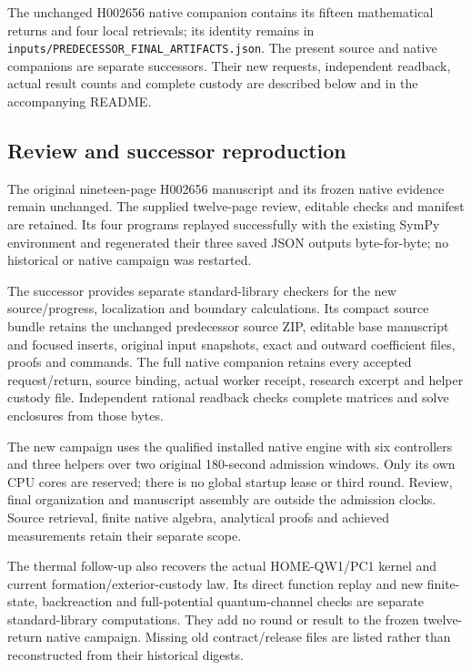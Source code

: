 \documentclass[10pt,twocolumn,letterpaper]{article}
\begin{document}
The unchanged H002656 native companion contains its fifteen mathematical
returns and four local retrievals; its identity remains in
\texttt{inputs/PREDECESSOR\_FINAL\_ARTIFACTS.json}. The present source
and native companions are separate successors. Their new requests,
independent readback, actual result counts and complete custody are
described below and in the accompanying README.


\subsection{Review and successor reproduction}
The original nineteen-page H002656 manuscript and its frozen native
evidence remain unchanged. The supplied twelve-page review, editable
checks and manifest are retained. Its four programs replayed successfully
with the existing SymPy environment and regenerated their three saved
JSON outputs byte-for-byte; no historical or native campaign was restarted.

The successor provides separate standard-library checkers for the new
source/progress, localization and boundary calculations. Its compact
source bundle retains the unchanged predecessor source ZIP, editable
base manuscript and focused inserts, original input snapshots, exact and
outward coefficient files, proofs and commands. The full native companion
retains every accepted request/return, source binding, actual worker
receipt, research excerpt and helper custody file. Independent rational
readback checks complete matrices and solve enclosures from those bytes.

The new campaign uses the qualified installed native engine with six
controllers and three helpers over two original 180-second admission
windows. Only its own CPU cores are reserved; there is no global startup
lease or third round. Review, final organization and manuscript assembly
are outside the admission clocks. Source retrieval, finite native algebra,
analytical proofs and achieved measurements retain their separate scope.


The thermal follow-up also recovers the actual HOME-QW1/PC1 kernel and
current formation/exterior-custody law. Its direct function replay and new
finite-state, backreaction and full-potential quantum-channel checks are
separate standard-library computations. They add no round or result to the
frozen twelve-return native campaign. Missing old contract/release files
are listed rather than reconstructed from their historical digests.
\end{document}
